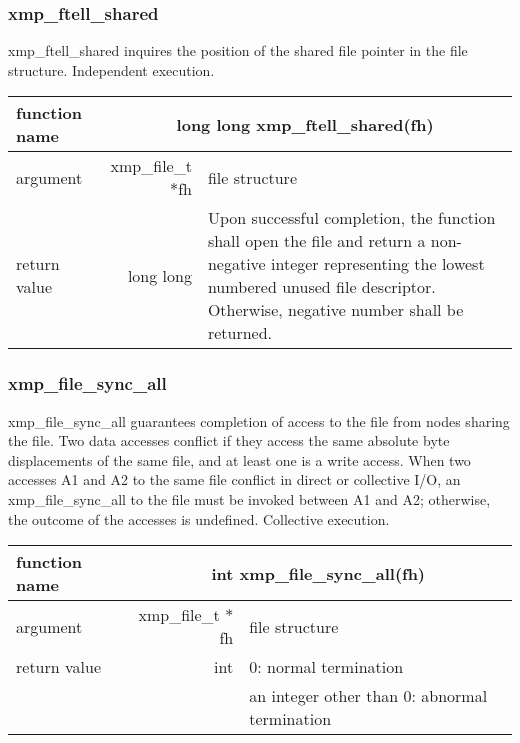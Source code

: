    \subsubsection{xmp\_ftell\_shared}
   xmp\_ftell\_shared inquires the position of the shared file pointer in
   the file structure. Independent execution.

   \clearpage
   \begin{table}[h]
    \begin{center}
     \begin{tabular}{|l|r|p{80mm}|}
      \hline
      {\bf function name}  & \multicolumn{2}{c|}{\bf long long
      xmp\_ftell\_shared(fh)} \\ \hline \hline
      argument & xmp\_file\_t $*$fh & file structure \\ \hline
      return value & long long & Upon successful completion, the
	      function shall open the file and return a non-negative
	      integer representing the lowest numbered unused file
	      descriptor. Otherwise, negative number shall be
	      returned. \\ \hline
      \end{tabular}
     \end{center}
    \label{tb:aaa}
   \end{table}

   \subsubsection{xmp\_file\_sync\_all}
   xmp\_file\_sync\_all guarantees completion of access to the file from nodes sharing the file.
   Two data accesses conflict if they access the same absolute byte
   displacements of the same file, and at least one is a write access. 
   When two accesses A1 and A2 to the same file conflict in direct or
   collective I/O, an xmp\_file\_sync\_all to the file must be invoked
   between A1 and A2; otherwise, the outcome of the accesses is
   undefined.
   Collective execution.

   \begin{table}[h]
    \begin{center}
     \begin{tabular}{|l|r|p{80mm}|}
      \hline
      {\bf function name}  & \multicolumn{2}{c|}{\bf int
      xmp\_file\_sync\_all(fh)} \\ \hline \hline
      argument & xmp\_file\_t $*$fh & file structure \\ \hline
      return value & int & 0: normal termination \\
      &  & an integer other than 0: abnormal termination \\ \hline
      \end{tabular}
     \end{center}
    \label{tb:aaa}
   \end{table}

